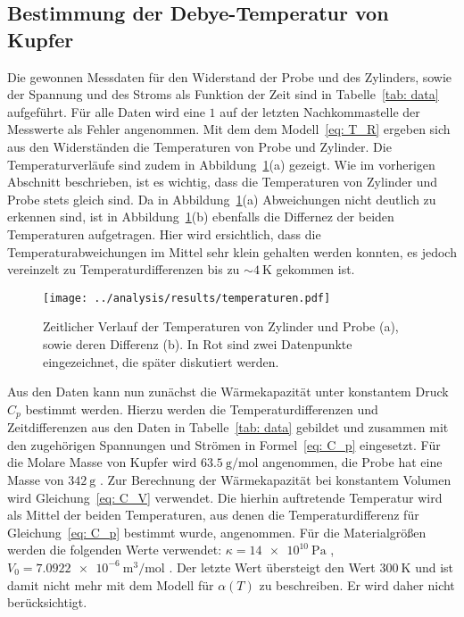 \subsection{Bestimmung der Debye-Temperatur von Kupfer}
Die gewonnen Messdaten für den Widerstand der Probe und des Zylinders, sowie der Spannung und des Stroms
als Funktion der Zeit sind in Tabelle~\ref{tab: data} aufgeführt. Für alle Daten wird eine $1$ auf der letzten
Nachkommastelle der Messwerte als Fehler angenommen.
Mit dem dem Modell~\eqref{eq: T_R} ergeben sich aus den Widerständen die Temperaturen von Probe und Zylinder.
Die Temperaturverläufe sind zudem in Abbildung~\ref{fig: temp}(a) gezeigt. Wie im vorherigen Abschnitt beschrieben, ist es
wichtig, dass die Temperaturen von Zylinder und Probe stets gleich sind. Da in Abbildung~\ref{fig: temp}(a) Abweichungen nicht
deutlich zu erkennen sind, ist in Abbildung~\ref{fig: temp}(b) ebenfalls die Differnez der beiden Temperaturen
aufgetragen. Hier wird ersichtlich, dass die Temperaturabweichungen im Mittel sehr klein gehalten werden konnten, es
jedoch vereinzelt zu Temperaturdifferenzen bis zu $\sim\!\SI{4}{\kelvin}$ gekommen ist.
\begin{figure}
\centering
\texttt{[image: ../analysis/results/temperaturen.pdf]}
\caption{Zeitlicher Verlauf der Temperaturen von Zylinder und Probe (a), sowie deren Differenz (b). In Rot sind
        zwei Datenpunkte eingezeichnet, die später diskutiert werden.}
\label{fig: temp}
\end{figure}



Aus den Daten kann nun zunächst die Wärmekapazität unter konstantem Druck $C_p$ bestimmt werden. Hierzu werden
die Temperaturdifferenzen und Zeitdifferenzen aus den Daten in Tabelle~\ref{tab: data} gebildet und zusammen mit den
zugehörigen Spannungen und Strömen in Formel~\eqref{eq: C_p} eingesetzt. Für die Molare Masse von Kupfer
wird $\SI{63.5}{\gram / \mol}$ \cite{molarmass} angenommen, die Probe hat eine Masse von $\SI{342}{\gram}$ \cite{anleitungV47}.
Zur Berechnung der Wärmekapazität
bei konstantem Volumen wird Gleichung~\eqref{eq: C_V} verwendet. Die hierhin auftretende Temperatur wird als Mittel
der beiden Temperaturen, aus denen die Temperaturdifferenz für Gleichung~\eqref{eq: C_p} bestimmt wurde, angenommen.
Für die Materialgrößen werden die folgenden Werte verwendet: $\kappa = \SI{14e10}{\pascal}$ \cite{gross}, $V_0 = \SI{7.0922e-6}{\meter^3 / \mol}$ \cite{volume}.
Der letzte Wert übersteigt den Wert $\SI{300}{\kelvin}$ und ist damit nicht mehr mit dem Modell für $\alpha(T)$
zu beschreiben. Er wird daher nicht berücksichtigt.

